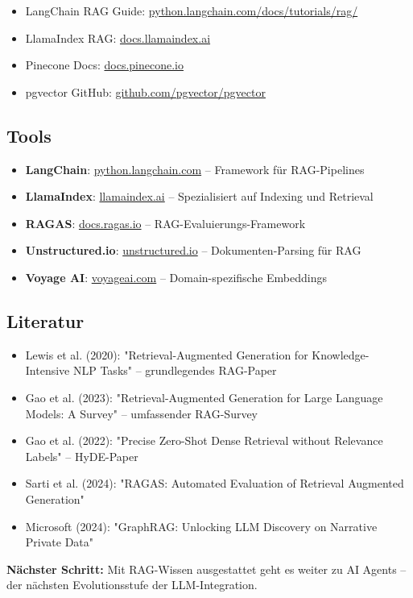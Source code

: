 \begin{itemize}[leftmargin=*]
    \item LangChain RAG Guide: \href{https://python.langchain.com/docs/tutorials/rag/}{python.langchain.com/docs/tutorials/rag/}
    \item LlamaIndex RAG: \href{https://docs.llamaindex.ai/en/stable/}{docs.llamaindex.ai}
    \item Pinecone Docs: \href{https://docs.pinecone.io}{docs.pinecone.io}
    \item pgvector GitHub: \href{https://github.com/pgvector/pgvector}{github.com/pgvector/pgvector}
\end{itemize}

\subsection{Tools}

\begin{itemize}[leftmargin=*]
    \item \textbf{LangChain}: \href{https://python.langchain.com}{python.langchain.com} -- Framework für RAG-Pipelines
    \item \textbf{LlamaIndex}: \href{https://www.llamaindex.ai}{llamaindex.ai} -- Spezialisiert auf Indexing und Retrieval
    \item \textbf{RAGAS}: \href{https://docs.ragas.io}{docs.ragas.io} -- RAG-Evaluierungs-Framework
    \item \textbf{Unstructured.io}: \href{https://unstructured.io}{unstructured.io} -- Dokumenten-Parsing für RAG
    \item \textbf{Voyage AI}: \href{https://voyageai.com}{voyageai.com} -- Domain-spezifische Embeddings
\end{itemize}

\subsection{Literatur}

\begin{itemize}[leftmargin=*]
    \item Lewis et al. (2020): "Retrieval-Augmented Generation for Knowledge-Intensive NLP Tasks" -- grundlegendes RAG-Paper
    \item Gao et al. (2023): "Retrieval-Augmented Generation for Large Language Models: A Survey" -- umfassender RAG-Survey
    \item Gao et al. (2022): "Precise Zero-Shot Dense Retrieval without Relevance Labels" -- HyDE-Paper
    \item Sarti et al. (2024): "RAGAS: Automated Evaluation of Retrieval Augmented Generation"
    \item Microsoft (2024): "GraphRAG: Unlocking LLM Discovery on Narrative Private Data"
\end{itemize}

\textbf{Nächster Schritt:} Mit RAG-Wissen ausgestattet geht es weiter zu AI Agents -- der nächsten Evolutionsstufe der LLM-Integration.
